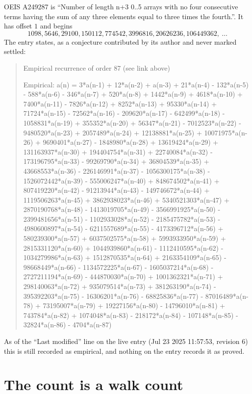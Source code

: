 \documentclass[11pt,a4paper]{article}
\theoremstyle{plain}
\theoremstyle{definition}
\begin{document}
OEIS A249287 is ``Number of length n+3 0..5 arrays with no four consecutive terms having the sum of any three elements equal to three times the fourth.''. It has offset $1$ and begins
\[
1098, 5646, 29100, 150112, 774542, 3996816, 20626236, 106449362,\ \dots
\]
The entry states, as a conjecture contributed by its author and never marked settled:
\begin{quote}\raggedright\small
Empirical recurrence of order 87 (see link above)

Empirical: a(n) = 3*a(n-1) + 12*a(n-2) + a(n-3) + 21*a(n-4) - 132*a(n-5) - 588*a(n-6) - 346*a(n-7) + 520*a(n-8) + 1442*a(n-9) + 4618*a(n-10) + 7400*a(n-11) - 7826*a(n-12) + 8252*a(n-13) + 95330*a(n-14) + 71724*a(n-15) - 72562*a(n-16) - 209620*a(n-17) - 642499*a(n-18) - 1058831*a(n-19) + 355352*a(n-20) + 56347*a(n-21) - 7012523*a(n-22) - 9480520*a(n-23) + 2057489*a(n-24) + 12138881*a(n-25) + 10071975*a(n-26) + 9690401*a(n-27) - 1848980*a(n-28) + 13619424*a(n-29) + 131163937*a(n-30) + 194404754*a(n-31) + 22740084*a(n-32) - 173196795*a(n-33) - 99269790*a(n-34) + 36804539*a(n-35) + 43668553*a(n-36) - 226146991*a(n-37) - 1056300175*a(n-38) - 1526072442*a(n-39) - 555006247*a(n-40) + 848674502*a(n-41) + 807419220*a(n-42) - 91213944*a(n-43) - 149746672*a(n-44) + 1119506263*a(n-45) + 3862938023*a(n-46) + 5340521303*a(n-47) + 2870190768*a(n-48) - 1413019705*a(n-49) - 3566991925*a(n-50) - 2399481656*a(n-51) - 1102933028*a(n-52) - 2185475782*a(n-53) - 4980600897*a(n-54) - 6211557689*a(n-55) - 4173396712*a(n-56) + 580239300*a(n-57) + 6037502575*a(n-58) + 5993933950*a(n-59) + 2815331120*a(n-60) + 1044939860*a(n-61) - 1112410595*a(n-62) - 1034279986*a(n-63) + 1512870535*a(n-64) + 2163354109*a(n-65) - 98668449*a(n-66) - 1134572225*a(n-67) - 1605037214*a(n-68) - 2727211194*a(n-69) - 444870030*a(n-70) + 1001362321*a(n-71) + 298140063*a(n-72) + 935079514*a(n-73) + 381263190*a(n-74) - 395392203*a(n-75) - 16306201*a(n-76) - 68825836*a(n-77) - 87016489*a(n-78) + 73195007*a(n-79) + 19227156*a(n-80) - 14796010*a(n-81) + 743784*a(n-82) + 1074048*a(n-83) - 218172*a(n-84) - 107148*a(n-85) - 32824*a(n-86) - 4704*a(n-87)
\end{quote}
As of the ``Last modified'' line on the live entry (Jul 23 2025 11:57:53, revision 6) this is still
recorded as empirical, and nothing on the entry records it as proved.

\section{The count is a walk count}
\end{document}
